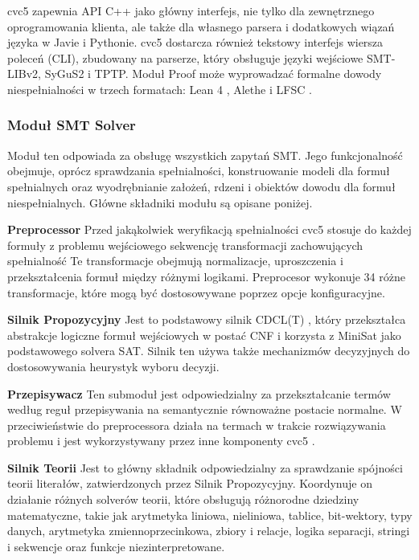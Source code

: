 cvc5 zapewnia API C++ jako główny interfejs, nie tylko dla zewnętrznego oprogramowania klienta, ale także dla własnego parsera i dodatkowych wiązań języka w Javie i Pythonie. cvc5 dostarcza również tekstowy interfejs wiersza poleceń (CLI), zbudowany na parserze, który obsługuje języki wejściowe SMT-LIBv2, SyGuS2 i TPTP. Moduł Proof może wyprowadzać formalne dowody niespełnialności w trzech formatach: Lean 4 \cite{Moura021}, Alethe \cite{abs-2107-02354} i LFSC \cite{StumpORHT13}.

\subsubsection{Moduł SMT Solver} Moduł ten odpowiada za obsługę wszystkich zapytań SMT. Jego funkcjonalność obejmuje, oprócz sprawdzania spełnialności, konstruowanie modeli dla formuł spełnialnych oraz wyodrębnianie założeń, rdzeni i obiektów dowodu dla formuł niespełnialnych. Główne składniki modułu są opisane poniżej.

\textbf{Preprocessor} Przed jakąkolwiek weryfikacją spełnialności cvc5 stosuje do każdej formuły z problemu wejściowego sekwencję transformacji zachowujących spełnialność Te transformacje obejmują normalizacje, uproszczenia i przekształcenia formuł między różnymi logikami. Preprocesor wykonuje 34 różne transformacje, które mogą być dostosowywane poprzez opcje konfiguracyjne.

\textbf{Silnik Propozycyjny} Jest to podstawowy silnik CDCL(T) \cite{NieuwenhuisOT06}, który przekształca abstrakcje logiczne formuł wejściowych w postać CNF i korzysta z MiniSat jako podstawowego solvera SAT. Silnik ten używa także mechanizmów decyzyjnych do dostosowywania heurystyk wyboru decyzji.

\textbf{Przepisywacz} Ten submoduł jest odpowiedzialny za przekształcanie termów według reguł przepisywania na semantycznie równoważne postacie normalne. W przeciwieństwie do preprocessora działa na termach w trakcie rozwiązywania problemu i jest wykorzystywany przez inne komponenty cvc5 \cite{NotzliRBNPBT19}.

\textbf{Silnik Teorii} Jest to główny składnik odpowiedzialny za sprawdzanie spójności teorii literałów, zatwierdzonych przez Silnik Propozycyjny. Koordynuje on działanie różnych solverów teorii, które obsługują różnorodne dziedziny matematyczne, takie jak arytmetyka liniowa, nieliniowa, tablice, bit-wektory, typy danych, arytmetyka zmiennoprzecinkowa, zbiory i relacje, logika separacji, stringi i sekwencje oraz funkcje niezinterpretowane.


